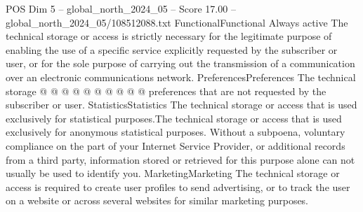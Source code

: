 \begin{textsample}{POS Dim 5 – global\_north\_2024\_05 – Score 17.00 – global\_north\_2024\_05/108512088.txt}
FunctionalFunctional Always active The technical storage or access is strictly necessary for the legitimate purpose of enabling the use of a specific service explicitly requested by the subscriber or user, or for the sole purpose of carrying out the transmission of a communication over an electronic communications network.
PreferencesPreferences The technical storage @ @ @ @ @ @ @ @ @ @ preferences that are not requested by the subscriber or user.
StatisticsStatistics The technical storage or access that is used exclusively for statistical purposes.The technical storage or access that is used exclusively for anonymous statistical purposes.
Without a subpoena, voluntary compliance on the part of your Internet Service Provider, or additional records from a third party, information stored or retrieved for this purpose alone can not usually be used to identify you.
MarketingMarketing The technical storage or access is required to create user profiles to send advertising, or to track the user on a website or across several websites for similar marketing purposes.

\end{textsample}
